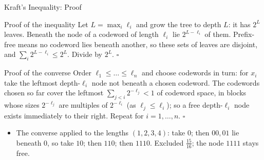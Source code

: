\begin{frame}{Kraft's Inequality: Proof}
  \small
  \begin{block}{Proof of the inequality}
    Let $L=\max_i\ell_i$ and grow the tree to depth $L$: it has $2^L$ leaves. Beneath the node of a codeword of length $\ell_i$ lie $2^{L-\ell_i}$ of them.
    Prefix-free means no codeword lies beneath another, so these sets of leaves are disjoint, and $\sum_i2^{L-\ell_i}\le2^L$. Divide by $2^L$. \hfill$\square$
  \end{block}
  \begin{block}{Proof of the converse}
    Order $\ell_1\le\dots\le\ell_n$ and choose codewords in turn: for $x_i$ take the leftmost depth-$\ell_i$ node not beneath a chosen codeword.
    The codewords chosen so far cover the leftmost $\sum_{j<i}2^{-\ell_j}<1$ of codeword space, in blocks whose sizes $2^{-\ell_j}$ are multiples of $2^{-\ell_i}$ (as $\ell_j\le\ell_i$); so a free depth-$\ell_i$ node exists immediately to their right.
Repeat for $i=1,\dots,n$. \hfill$\square$
  \end{block}
  \begin{itemize}
    \item The converse applied to the lengths $(1,2,3,4)$: take $0$; then $00,01$ lie beneath $0$, so take $10$; then $110$; then $1110$. Excluded $\tfrac{15}{16}$; the node $1111$ stays free.
  \end{itemize}
\end{frame}

